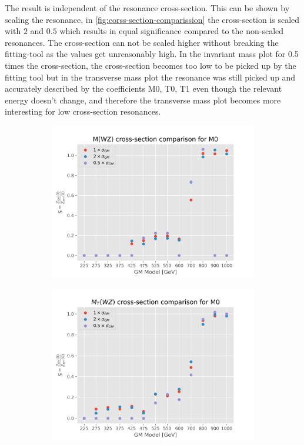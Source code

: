 \documentclass[../Bachelorarbeit.tex]{subfiles}
\begin{document}
\newpage
The result is independent of the resonance cross-section. This can be shown by scaling the resonance, in \ref{fig:corss-section-comparission} the cross-section is scaled with $2$ and $0.5$ which results in equal significance compared to the non-scaled resonances.
The cross-section can not be scaled higher without breaking the fitting-tool as the values get unreasonably high. In the invariant mass plot for 0.5 times the cross-section, the cross-section becomes too low to be picked up by the fitting tool but in the transverse mass plot
the resonance was still picked up and accurately described by the coefficients M0, T0, T1 even though the relevant energy doesn't change, and therefore the transverse mass plot becomes more interesting for low cross-section resonances.
\begin{figure}[h]
    \centering
    \begin{subfigure}{0.45\textwidth}
        \includegraphics[width=\textwidth]{Plots/gm_relevanze/MWZ_comparision_M0.png}
        \caption{}
    \end{subfigure}
    \begin{subfigure}{0.45\textwidth}
        \includegraphics[width=\textwidth]{Plots/gm_relevanze/MTWZ_comparision_M0.png}

\end{subfigure}
\end{figure}
\end{document}
